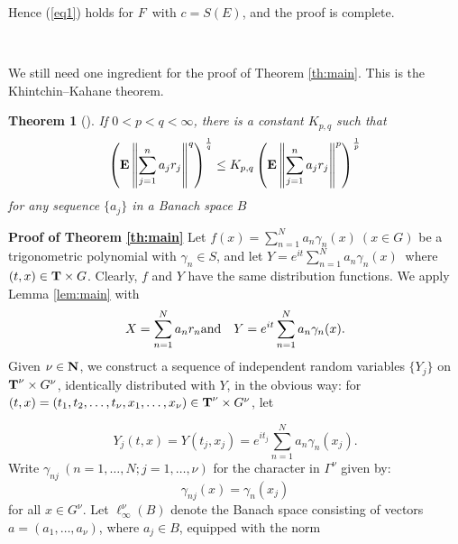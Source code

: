 Hence (\ref{eq1}) holds for $F$\ with $c = S(E)$, and the proof is complete.

\

We still need one ingredient for the proof of Theorem \ref{th:main}.
This is the Khintchin--Kahane theorem.

\newtheorem{th:KK}[join]{Theorem}
\begin{th:KK}[{\cite[Th\'eor\`eme K]{bib:Pi1}}]
If $0<p<q<\infty$, there is a constant $K_{p,q}$ such that
\begin{equation}
\left( {\bf E}\left\|\sum_{j=1}^na_jr_j\right\|^q\right)^{\frac{1}{q}}
\leq
K_{p,q}\left( {\bf
E}\left\|\sum_{j=1}^na_jr_j\right\|^p\right)^{\frac{1}{p}}
\label{eq:KK}
\end{equation}
for any sequence $\{a_j\}$ in a Banach space $B$

\label{th:KK}
\end{th:KK}


{\bf Proof of Theorem \ref{th:main}}
Let $f(x)= \sum_{n=1}^Na_n\gamma_n(x)\ (x\in G)$ be a trigonometric
polynomial with
$\gamma_n\in S$, and let $Y=e^{it}\sum_{n=1}^Na_n\gamma_n(x)\ $
where $(t,x)\in
{\hbox{\bf T}}\times G$. Clearly, $f$ and $Y$ have the same distribution functions.
We apply Lemma \ref{lem:main} with
\begin{eqnarray*}
 X= \sum_{n=1}^Na_nr_n & {\rm and} & Y= e^{it}\sum_{n=1}^Na_n\gamma_n(x).
\end{eqnarray*}
%
Given $\nu \in {\hbox{\bf N}}$, we construct a sequence of independent random
variables $\{Y_j\}$ on ${\hbox{\bf T}}^\nu\times G^\nu$, identically distributed with
$Y$, in the
obvious way:  for $(t,x)=(t_1, t_2,\ldots , t_\nu , x_1, \dots, x_\nu)
\in {\hbox{\bf T}}^\nu \times G^\nu$, let

\begin{equation}
Y_j(t,x) =Y(t_j,x_j)=e^{it_j}\sum_{n=1}^Na_n\gamma_n(x_j).
\label{eq:yj}
\end{equation}
Write $\gamma_{nj}\ (n = 1, \ldots , N; j=1, \ldots , \nu)$ for the
character in $\Gamma^\nu$ given by:
$$\gamma_{nj}(x)=\gamma_n(x_j)$$
for all $x \in G^\nu$.  Let $\ell^\nu_\infty (B)$ denote the Banach space
consisting of vectors $a=(a_1,\ldots , a_\nu )$,
where $a_j \in B$, equipped with the norm

